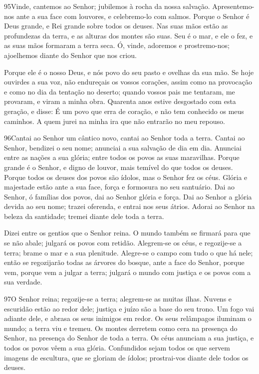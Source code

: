 \lettrine{95}{}Vinde, cantemos ao Senhor; jubilemos à rocha da
nossa salvação. Apresentemo-nos ante a sua face com louvores, e
celebremo-lo com salmos. Porque o Senhor é Deus grande, e Rei
grande sobre todos os deuses. Nas suas mãos estão as profundezas
da terra, e as alturas dos montes são suas. Seu é o mar, e ele o
fez, e as suas mãos formaram a terra seca. Ó, vinde, adoremos e
prostremo-nos; ajoelhemos diante do Senhor que nos criou.

Porque ele é o nosso Deus, e nós povo do seu pasto e ovelhas da
sua mão. Se hoje ouvirdes a sua voz, não endureçais os vossos
corações, assim como na provocação e como no dia da tentação no
deserto; quando vossos pais me tentaram, me provaram, e viram a
minha obra. Quarenta anos estive desgostado com esta geração,
e disse: É um povo que erra de coração, e não tem conhecido os meus
caminhos. A quem jurei na minha ira que não entrarão no meu
repouso.

\bigskip

\lettrine{96}{}Cantai ao Senhor um cântico novo, cantai ao
Senhor toda a terra. Cantai ao Senhor, bendizei o seu nome;
anunciai a sua salvação de dia em dia. Anunciai entre as nações
a sua glória; entre todos os povos as suas maravilhas. Porque
grande é o Senhor, e digno de louvor, mais temível do que todos os
deuses. Porque todos os deuses dos povos são ídolos, mas o
Senhor fez os céus. Glória e majestade estão ante a sua face,
força e formosura no seu santuário. Dai ao Senhor, ó famílias
dos povos, dai ao Senhor glória e força. Dai ao Senhor a glória
devida ao seu nome; trazei oferenda, e entrai nos seus átrios.
Adorai ao Senhor na beleza da santidade; tremei diante dele toda
a terra.

Dizei entre os gentios que o Senhor reina. O mundo também se
firmará para que se não abale; julgará os povos com retidão.
Alegrem-se os céus, e regozije-se a terra; brame o mar e a
sua plenitude. Alegre-se o campo com tudo o que há nele;
então se regozijarão todas as árvores do bosque, ante a face
do Senhor, porque vem, porque vem a julgar a terra; julgará o mundo
com justiça e os povos com a sua verdade.

\bigskip

\lettrine{97}{}O Senhor reina; regozije-se a terra; alegrem-se
as muitas ilhas. Nuvens e escuridão estão ao redor dele; justiça
e juízo são a base do seu trono. Um fogo vai adiante dele, e
abrasa os seus inimigos em redor. Os seus relâmpagos iluminam o
mundo; a terra viu e tremeu. Os montes derretem como cera na
presença do Senhor, na presença do Senhor de toda a terra. Os
céus anunciam a sua justiça, e todos os povos vêem a sua glória.
Confundidos sejam todos os que servem imagens de escultura, que
se gloriam de ídolos; prostrai-vos diante dele todos os deuses.

